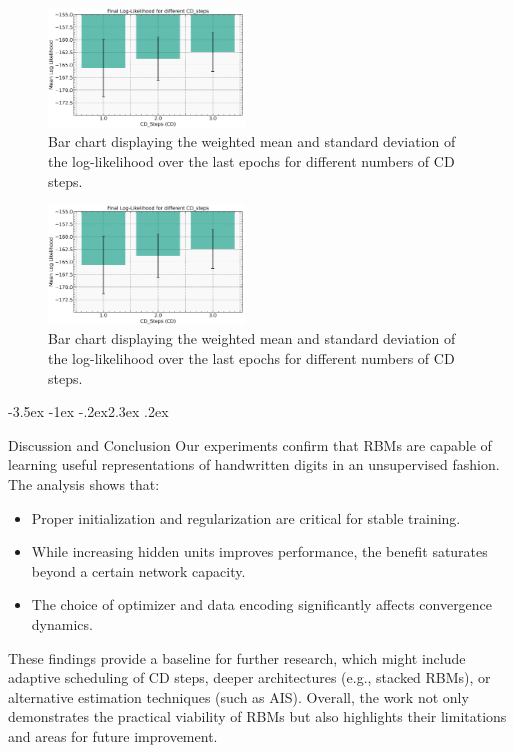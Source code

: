 \documentclass[prl,twocolumn]{revtex4-1}
\makeatletter
\renewcommand{\section}{\@startsection{section}{1}{\z@}%
    {-3.5ex \@plus -1ex \@minus -.2ex}{2.3ex \@plus.2ex}%
    {\normalfont\bfseries\raggedright}}
\makeatother
\begin{document}
\begin{figure}[!tb]
	\includegraphics[width=0.465\textwidth]{final_L_of_CD.png}
	\caption{Bar chart displaying the weighted mean and standard deviation of the log-likelihood over the last epochs for different numbers of CD steps.}
	\label{fig:final_L_of_CD}
\end{figure}

\begin{figure}[!tb]
	\includegraphics[width=0.465\textwidth]{final_L_of_CD.png}
	\caption{Bar chart displaying the weighted mean and standard deviation of the log-likelihood over the last epochs for different numbers of CD steps.}
	\label{fig:final_L_of_CD}
\end{figure}

\section{Discussion and Conclusion}
\label{sec:discussion}
Our experiments confirm that RBMs are capable of learning useful representations of handwritten digits in an unsupervised fashion. The analysis shows that:
\begin{itemize}
	\item Proper initialization and regularization are critical for stable training.
	\item While increasing hidden units improves performance, the benefit saturates beyond a certain network capacity.
	\item The choice of optimizer and data encoding significantly affects convergence dynamics.
\end{itemize}
These findings provide a baseline for further research, which might include adaptive scheduling of CD steps, deeper architectures (e.g., stacked RBMs), or alternative estimation techniques (such as AIS). Overall, the work not only demonstrates the practical viability of RBMs but also highlights their limitations and areas for future improvement.
\end{document}
